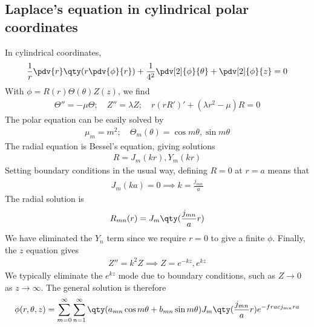 \subsection{Laplace's equation in cylindrical polar coordinates}
In cylindrical coordinates,
\begin{align*}
	\frac{1}{r} \pdv{r} \qty(r \pdv{\phi}{r}) + \frac{1}{4^2} \pdv[2]{\phi}{\theta} + \pdv[2]{\phi}{z} = 0
\end{align*}
With $\phi = R(r) \Theta(\theta) Z(z)$, we find
\begin{align*}
	\Theta'' = -\mu \Theta;\quad Z'' = \lambda Z;\quad r(rR')' + (\lambda r^2 - \mu) R = 0
\end{align*}
The polar equation can be easily solved by
\begin{align*}
	\mu_m = m^2;\quad \Theta_m(\theta) = \cos m\theta, \sin m\theta
\end{align*}
The radial equation is Bessel's equation, giving solutions
\begin{align*}
	R = J_m(kr), Y_m(kr)
\end{align*}
Setting boundary conditions in the usual way, defining $R=0$ at $r = a$ means that
\begin{align*}
	J_m(ka) = 0 \implies k = \frac{j_{mn}}{a}
\end{align*}
The radial solution is
\begin{align*}
	R_{mn}(r) = J_m\qty(\frac{j_{mn}}{a}r)
\end{align*}
We have eliminated the $Y_n$ term since we require $r = 0$ to give a finite $\phi$.
Finally, the $z$ equation gives
\begin{align*}
	Z'' = k^2 Z \implies Z = e^{-kz}, e^{kz}
\end{align*}
We typically eliminate the $e^{kz}$ mode due to boundary conditions, such as $Z \to 0$ as $z \to \infty$.
The general solution is therefore
\begin{align*}
	\phi(r,\theta,z) = \sum_{m=0}^\infty \sum_{n = 1}^\infty \qty(a_{mn} \cos m\theta + b_{mn} \sin m\theta) J_m\qty(\frac{j_{mn}}{a} r) e^{-frac{j_{mn}r}{a}}
\end{align*}

